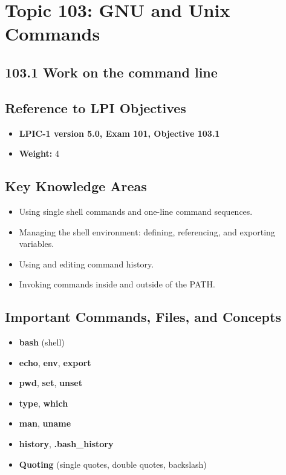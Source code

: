 \documentclass[a4paper]{report}
\begin{document}
\newpage
\chapter{Topic 103: GNU and Unix Commands}

\newpage
\section*{103.1 Work on the command line}


\section*{Reference to LPI Objectives}
\begin{itemize}
    \item \textbf{LPIC-1 version 5.0, Exam 101, Objective 103.1}
    \item \textbf{Weight:} 4
\end{itemize}

\section*{Key Knowledge Areas}
\begin{itemize}
    \item Using single shell commands and one-line command sequences.
    \item Managing the shell environment: defining, referencing, and exporting variables.
    \item Using and editing command history.
    \item Invoking commands inside and outside of the PATH.
\end{itemize}

\section*{Important Commands, Files, and Concepts}
\begin{itemize}
    \item \textbf{bash} (shell)
    \item \textbf{echo}, \textbf{env}, \textbf{export}
    \item \textbf{pwd}, \textbf{set}, \textbf{unset}
    \item \textbf{type}, \textbf{which}
    \item \textbf{man}, \textbf{uname}
    \item \textbf{history}, \textbf{.bash\_history}
    \item \textbf{Quoting} (single quotes, double quotes, backslash)
\end{itemize}
\end{document}

